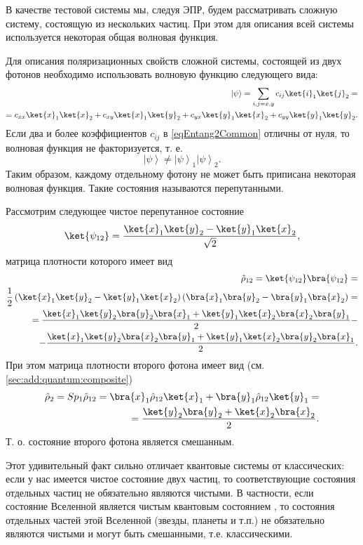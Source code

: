 В качестве тестовой системы мы, следуя ЭПР, будем рассматривать сложную
систему, состоящую из нескольких частиц. При этом для описания всей
системы используется некоторая общая волновая функция.

Для описания поляризационных свойств сложной системы, состоящей из двух
фотонов необходимо использовать волновую функцию следующего вида:
\begin{eqnarray}
\left|\psi\right> = \sum_{i,j = x,y} 
c_{ij}\ket{i}_1\ket{j}_2 = 
\nonumber \\
= c_{xx} \ket{x}_1\ket{x}_2 +
c_{xy} \ket{x}_1\ket{y}_2 +
c_{yx} \ket{y}_1\ket{x}_2 +
c_{yy} \ket{y}_1\ket{y}_2.
\label{eqEntang2Common}
\end{eqnarray}
Если два и более коэффициентов $c_{ij}$ в \eqref{eqEntang2Common}
отличны от нуля, то волновая функция не факторизуется, т. е. 
\[
\left|\psi\right> \ne \left|\psi\right>_1 \left|\psi\right>_2.
\]
Таким образом, каждому отдельному фотону не может быть приписана
некоторая волновая функция. Такие состояния называются перепутанными.

\begin{remark}
Рассмотрим следующее чистое перепутанное состояние
\[
  \ket{\psi_{12}} = \frac{
    \ket{ x }_1\ket{ y }_2 -
    \ket{ y }_1\ket{ x }_2
  }{\sqrt{2}},
\]
матрица плотности которого имеет вид
\begin{eqnarray}
\hat{\rho}_{12} = \ket{\psi_{12}}\bra{\psi_{12}} =
\nonumber \\ 
\frac{1}{2}
\left(
\ket{ x }_1\ket{ y }_2 -
\ket{ y }_1\ket{ x }_2
\right)
\left(
\bra{ x }_1\bra{ y }_2 -
\bra{ y }_1\bra{ x }_2
\right) =
\nonumber \\
= 
\frac{
\ket{ x }_1\ket{ y }_2\bra{ y }_2\bra{ x }_1 +
\ket{ y }_1\ket{ x }_2\bra{ x }_2\bra{ y }_1 }
{2} -
\nonumber \\
-
\frac{
\ket{ x }_1\ket{ y }_2\bra{ x }_2\bra{ y }_1 +
\ket{ y }_1\ket{ x }_2\bra{ y }_2\bra{ x }_1 
}
{2}.
\nonumber
\end{eqnarray}
При этом матрица плотности второго фотона имеет вид
(см. \autoref{sec:add:quantum:composite})
\begin{eqnarray}
\hat{\rho}_2 = Sp_1 \hat{\rho}_{12} = 
\bra{x}_1 \hat{\rho}_{12} \ket{x}_1 +
\bra{y}_1 \hat{\rho}_{12} \ket{y}_1 =
\nonumber \\
=
\frac{
\ket{ y }_2\bra{ y }_2 +
\ket{ x }_2\bra{ x }_2 }
{2}.
\nonumber
\end{eqnarray}
Т. о. состояние второго фотона является смешанным.

Этот удивительный факт сильно отличает
квантовые системы от классических: если у нас имеется чистое состояние
двух частиц, то соответствующие состояния отдельных частиц не
обязательно являются чистыми. В частности,
если состояние Вселенной является чистым квантовым состоянием
\cite{PhysRevD.28.2960}, то 
состояния отдельных частей этой Вселенной (звезды, планеты и т.п.) не
обязательно являются чистыми и могут быть смешанными, т.е.
классическими. 

\end{remark}

